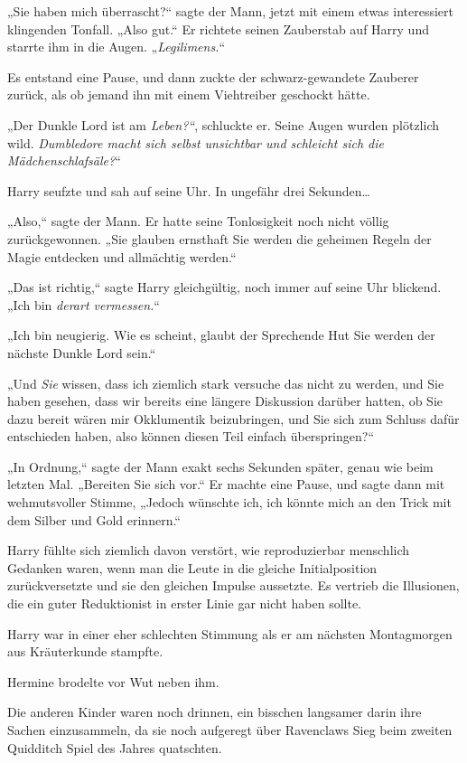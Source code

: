 {„Sie haben mich überrascht?“ sagte der Mann, jetzt mit einem etwas interessiert klingenden Tonfall. „Also gut.“ Er richtete seinen Zauberstab auf Harry und starrte ihm in die Augen. „\emph{Legilimens.}“

Es entstand eine Pause, und dann zuckte der schwarz-gewandete Zauberer zurück, als ob jemand ihn mit einem Viehtreiber geschockt hätte.

„Der Dunkle Lord ist am \emph{Leben?“}, schluckte er. Seine Augen wurden plötzlich wild. \emph{Dumbledore macht sich selbst unsichtbar und schleicht sich die Mädchenschlafsäle?}“

Harry seufzte und sah auf seine Uhr. In ungefähr drei Sekunden…

„Also,“ sagte der Mann. Er hatte seine Tonlosigkeit noch nicht völlig zurückgewonnen. „Sie glauben ernsthaft Sie werden die geheimen Regeln der Magie entdecken und allmächtig werden.“

„Das ist richtig,“ sagte Harry gleichgültig, noch immer auf seine Uhr blickend. „Ich bin \emph{derart vermessen.}“

„Ich bin neugierig. Wie es scheint, glaubt der Sprechende Hut Sie werden der nächste Dunkle Lord sein.“

„Und \emph{Sie} wissen, dass ich ziemlich stark versuche das nicht zu werden, und Sie haben gesehen, dass wir bereits eine längere Diskussion darüber hatten, ob Sie dazu bereit wären mir Okklumentik beizubringen, und Sie sich zum Schluss dafür entschieden haben, also können diesen Teil einfach überspringen?“

„In Ordnung,“ sagte der Mann exakt sechs Sekunden später, genau wie beim letzten Mal. „Bereiten Sie sich vor.“ Er machte eine Pause, und sagte dann mit wehmutsvoller Stimme, „Jedoch wünschte ich, ich könnte mich an den Trick mit dem Silber und Gold erinnern.“

Harry fühlte sich ziemlich davon verstört, wie reproduzierbar menschlich Gedanken waren, wenn man die Leute in die gleiche Initialposition zurückversetzte und sie den gleichen Impulse aussetzte. Es vertrieb die Illusionen, die ein guter Reduktionist in erster Linie gar nicht haben sollte.

Harry war in einer eher schlechten Stimmung als er am nächsten Montagmorgen aus Kräuterkunde stampfte.

Hermine brodelte vor Wut neben ihm.

Die anderen Kinder waren noch drinnen, ein bisschen langsamer darin ihre Sachen einzusammeln, da sie noch aufgeregt über Ravenclaws Sieg beim zweiten Quidditch Spiel des Jahres quatschten.

}
